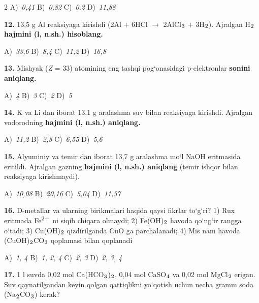 \documentclass[11pt,a4paper]{article}
\renewcommand{\textsubscript}[1]{\ensuremath{_{\text{\fontsize{8}{8}\selectfont #1}}}}
\renewcommand{\textsuperscript}[1]{\ensuremath{^{\text{\fontsize{8}{8}\selectfont #1}}}}
\begin{document}
\begin{multicols}{2}
\noindent A)~\textsl{0,41} \hfill B)~\textsl{0,82} \hfill C)~\textsl{0,2} \hfill D)~\textsl{11,88}\par
\vspace{4pt}
\noindent\textbf{12.} 13,5 g Al reaksiyaga kirishdi (2Al + 6HCl $\to$ 2AlCl\textsubscript{3} + 3H\textsubscript{2}). Ajralgan H\textsubscript{2} \textbf{hajmini (l, n.sh.) hisoblang.}

\noindent A)~\textsl{33,6} \hfill B)~\textsl{8,4} \hfill C)~\textsl{11,2} \hfill D)~\textsl{16,8}\par
\vspace{4pt}
\noindent\textbf{13.} Mishyak (\textit{Z} = 33) atomining eng tashqi pog`onasidagi p-elektronlar \textbf{sonini aniqlang.}

\noindent A)~\textsl{4} \hfill B)~\textsl{3} \hfill C)~\textsl{2} \hfill D)~\textsl{5}\par
\vspace{4pt}
\noindent\textbf{14.} K va Li dan iborat 13,1 g aralashma suv bilan reaksiyaga kirishdi. Ajralgan vodorodning \textbf{hajmini (l, n.sh.) aniqlang.}

\noindent A)~\textsl{11,2} \hfill B)~\textsl{2,8} \hfill C)~\textsl{6,55} \hfill D)~\textsl{5,6}\par
\vspace{4pt}
\noindent\textbf{15.} Alyuminiy va temir dan iborat 13,7 g aralashma mo`l NaOH eritmasida eritildi. Ajralgan gazning \textbf{hajmini (l, n.sh.) aniqlang} (temir ishqor bilan reaksiyaga kirishmaydi).

\noindent A)~\textsl{10,08} \hfill B)~\textsl{20,16} \hfill C)~\textsl{5,04} \hfill D)~\textsl{11,37}\par
\vspace{4pt}
\noindent\textbf{16.} D-metallar va ularning birikmalari haqida qaysi fikrlar to`g`ri? 1) Rux eritmada Fe\textsuperscript{2+} ni siqib chiqara olmaydi; 2) Fe(OH)\textsubscript{2} havoda qo`ng`ir rangga o`tadi; 3) Cu(OH)\textsubscript{2} qizdirilganda CuO ga parchalanadi; 4) Mis nam havoda (CuOH)\textsubscript{2}CO\textsubscript{3} qoplamasi bilan qoplanadi

\noindent A)~\textsl{1, 4} \hfill B)~\textsl{1, 2, 4} \hfill C)~\textsl{2, 3} \hfill D)~\textsl{2, 3, 4}\par
\vspace{4pt}
\noindent\textbf{17.} 1 l suvda 0,02 mol Ca(HCO\textsubscript{3})\textsubscript{2}, 0,04 mol CaSO\textsubscript{4} va 0,02 mol MgCl\textsubscript{2} erigan. Suv qaynatilgandan keyin qolgan qattiqlikni yo`qotish uchun necha gramm soda (Na\textsubscript{2}CO\textsubscript{3}) kerak?


\end{multicols}
\end{document}
